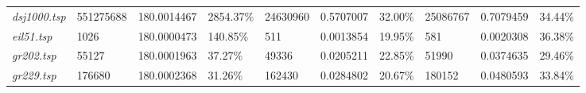 \begin{landscape}
\begin{table}[]
\begin{tabular}{llllllllll}
  \textit{dsj1000.tsp}                                  & 551275688                              & 180.0014467                                                                          & 2854.37\%                                                                              & 24630960                               & 0.5707007                                                                             & 32.00\%                                                                                & 25086767                               & 0.7079459                                                                            & 34.44\%                                                                                \\
  \textit{eil51.tsp}                                    & 1026                                   & 180.0000473                                                                          & 140.85\%                                                                               & 511                                    & 0.0013854                                                                             & 19.95\%                                                                                & 581                                    & 0.0020308                                                                            & 36.38\%                                                                                \\
  \textit{gr202.tsp}                                    & 55127                                  & 180.0001963                                                                          & 37.27\%                                                                                & 49336                                  & 0.0205211                                                                             & 22.85\%                                                                                & 51990                                  & 0.0374635                                                                            & 29.46\%                                                                                \\
  \textit{gr229.tsp}                                    & 176680                                 & 180.0002368                                                                          & 31.26\%                                                                                & 162430                                 & 0.0284802                                                                             & 20.67\%                                                                                & 180152                                 & 0.0480593                                                                            & 33.84\%                                                                                \\

\end{tabular}
\end{table}
\end{landscape}
